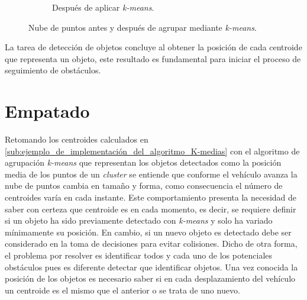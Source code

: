 \begin{figure}[h]
\begin{subfigure}[b]{0.45\textwidth}
         \caption{Después de aplicar \textit{k-means}.}
         \label{fig:pc_centroids}
     \end{subfigure}
     
    \caption{Nube de puntos antes y después de agrupar mediante \textit{k-means}.}
    \label{fig:pc_clustering}
\end{figure}
La tarea de detección de objetos concluye al obtener la posición de cada centroide que representa un objeto, este resultado es fundamental para iniciar el proceso de seguimiento de obstáculos.

\section{Empatado} \label{sec:empatado}

Retomando los centroides calculados en \ref{sub:ejemplo_de_implementación_del_algoritmo_K-medias} con el algoritmo de agrupación \textit{k-means} que representan los objetos detectados como la posición media de los puntos de un \textit{cluster} se entiende que conforme el vehículo avanza la nube de puntos cambia en tamaño y forma, como consecuencia el número de centroides varía en cada instante. Este comportamiento presenta la necesidad de saber con certeza que centroide es en cada momento, es decir, se requiere definir si un objeto ha sido previamente detectado con \textit{k-means} y solo ha variado mínimamente su posición. En cambio, si un nuevo objeto es detectado debe ser considerado en la toma de decisiones para evitar colisiones. Dicho de otra forma, el problema por resolver es identificar todos y cada uno de los potenciales obstáculos pues es diferente detectar que identificar objetos. Una vez conocida la posición de los objetos es necesario saber si en cada desplazamiento del vehículo un centroide es el mismo que el anterior o se trata de uno nuevo.

